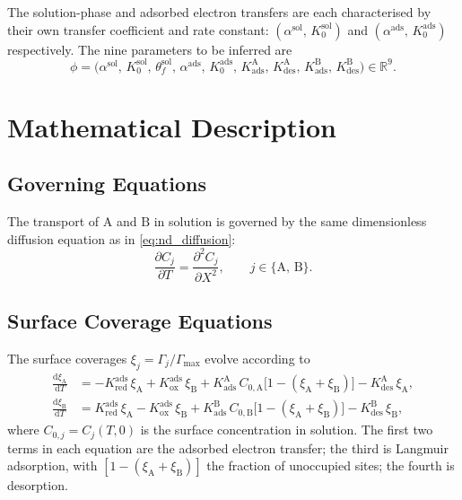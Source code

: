 The solution-phase and adsorbed electron transfers are each
characterised by their own transfer coefficient and rate constant:
$(\alpha^{\mathrm{sol}},\, K_0^{\mathrm{sol}})$ and
$(\alpha^{\mathrm{ads}},\, K_0^{\mathrm{ads}})$ respectively. The nine
parameters to be inferred are
\begin{equation}\label{eq:ads-params}
  \phi = \bigl(\alpha^{\mathrm{sol}},\, K_0^{\mathrm{sol}},\,
    \theta_f^{\mathrm{sol}},\,
    \alpha^{\mathrm{ads}},\, K_0^{\mathrm{ads}},\,
    K_{\mathrm{ads}}^{\mathrm{A}},\, K_{\mathrm{des}}^{\mathrm{A}},\,
    K_{\mathrm{ads}}^{\mathrm{B}},\, K_{\mathrm{des}}^{\mathrm{B}}
  \bigr) \in \mathbb{R}^9.
\end{equation}

\section{Mathematical Description}\label{sec:ads-maths}

\subsection{Governing Equations}

The transport of $\mathrm{A}$ and $\mathrm{B}$ in solution is governed
by the same dimensionless diffusion equation as in
\cref{eq:nd_diffusion}:
\begin{equation}\label{eq:ads-diffusion}
  \frac{\partial C_j}{\partial T} = \frac{\partial^2 C_j}{\partial X^2},
  \qquad j \in \{\mathrm{A},\,\mathrm{B}\}.
\end{equation}

\subsection{Surface Coverage Equations}

The surface coverages $\xi_j = \Gamma_j / \Gamma_{\mathrm{max}}$
evolve according to
\begin{equation}\label{eq:ads-coverage-ode}
  \begin{aligned}
    \frac{\mathrm{d}\xi_\mathrm{A}}{\mathrm{d}T}
    &= -K_{\mathrm{red}}^{\mathrm{ads}}\,\xi_\mathrm{A}
    + K_{\mathrm{ox}}^{\mathrm{ads}}\,\xi_\mathrm{B}
    + K_{\mathrm{ads}}^{\mathrm{A}}\,C_{0,\mathrm{A}}
    \bigl[1 - (\xi_\mathrm{A} + \xi_\mathrm{B})\bigr]
    - K_{\mathrm{des}}^{\mathrm{A}}\,\xi_\mathrm{A}, \\[4pt]
    \frac{\mathrm{d}\xi_\mathrm{B}}{\mathrm{d}T}
    &= K_{\mathrm{red}}^{\mathrm{ads}}\,\xi_\mathrm{A}
    - K_{\mathrm{ox}}^{\mathrm{ads}}\,\xi_\mathrm{B}
    + K_{\mathrm{ads}}^{\mathrm{B}}\,C_{0,\mathrm{B}}
    \bigl[1 - (\xi_\mathrm{A} + \xi_\mathrm{B})\bigr]
    - K_{\mathrm{des}}^{\mathrm{B}}\,\xi_\mathrm{B},
  \end{aligned}
\end{equation}
where $C_{0,j} = C_j(T, 0)$ is the surface concentration in solution.
The first two terms in each equation are the adsorbed electron transfer;
the third is Langmuir adsorption, with $[1 - (\xi_\mathrm{A} +
\xi_\mathrm{B})]$ the fraction of unoccupied sites; the fourth is
desorption.

